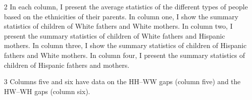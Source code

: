 \begin{table}[!h]
{\begin{threeparttable}
\begin{tablenotes}
\item[2] In each column, I present the average statistics of the different types of people based on the ethnicities of their parents. In column one, I show the summary statistics of children of White fathers and White mothers. In column two, I present the summary statistics of children of White fathers and Hispanic mothers. In column three, I show the summary statistics of children of Hispanic fathers and White mothers. In column four, I present the summary statistics of children of Hispanic fathers and mothers.
\item[3] Columns five and six have data on the HH--WW gaps (column five) and the HW--WH gaps (column six).
\end{tablenotes}
\end{threeparttable}}
\end{table}
